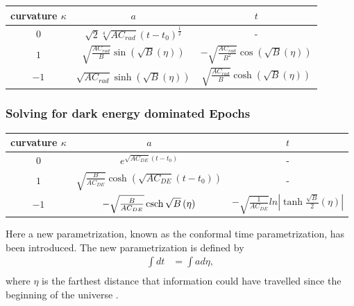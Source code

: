 \documentclass[a4paper, 11pt]{FSKH_623_Report}
\numberwithin{equation}{section}
\newcommand{\brac}[1]{\left(#1\right)}
\begin{document}
\begin{table}[H]
\centering
\begin{tabular}{| c | c | c |}
\hline\hline
curvature $\kappa$ &$a$  &$t$ \\
\hline\hline
$0$  &$\sqrt{2}\sqrt[4]{AC_{rad}}\brac{t-t_{0}}^{\frac{1}{2}}$ & - \\
\hline
$1$  &$\sqrt{\frac{AC_{rad}}{B}}\sin\brac{\sqrt{B}\brac{\eta}}$ & $-\sqrt{\frac{AC_{rad}}{B^{2}}}\cos\brac{\sqrt{B}\brac{\eta}}$ \\
\hline
$-1$  & $\sqrt{AC_{rad}}\sinh\brac{\sqrt{B}\brac{\eta}}$ & $\sqrt{\frac{AC_{rad}}{B}}\cosh\brac{\sqrt{B}\brac{\eta}}$ \\
\hline
\end{tabular}
\end{table}
\subsubsection{Solving for dark energy dominated Epochs}
\begin{table}[H]
\centering
\begin{tabular}{| c | c | c |}
\hline\hline
curvature $\kappa$ &$a$  &$t$ \\
\hline\hline
$0$  &$e^{\sqrt{AC_{DE}}\brac{t-t_{0}}}$ & - \\
\hline
$1$  &$\sqrt{\frac{B}{AC_{DE}}}\cosh\brac{\sqrt{AC_{DE}}\brac{t-t_{0}}}$ & - \\
\hline
$-1$  & $-\sqrt{\frac{B}{AC_{DE}}}\csch\sqrt{B}\brac{\eta}$ & $-\sqrt{\frac{1}{AC_{DE}}}ln\left|\tanh\frac{\sqrt{B}}{2}\brac{\eta}\right|$ \\
\hline
\end{tabular}
\end{table}
Here a new parametrization, known as the conformal time parametrization, has been introduced. The new parametrization is defined by 
\begin{equation}
\begin{split}
\int dt &= \int a d\eta,\\
\end{split}
\end{equation}
where $\eta$ is the farthest distance that information could have travelled since the beginning of the universe \citep{ConF}.
\end{document}
